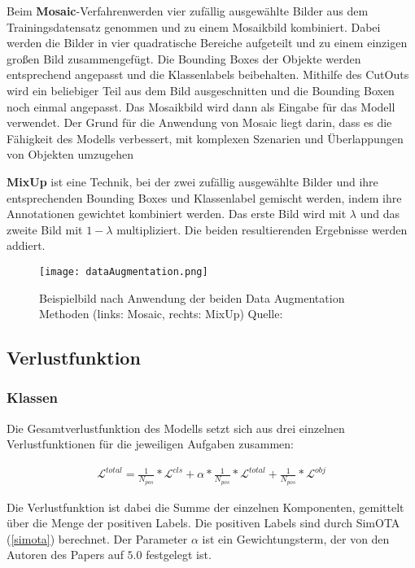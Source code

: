 Beim \textbf{Mosaic}-Verfahrenwerden vier zufällig ausgewählte Bilder aus dem Trainingsdatensatz genommen und zu einem Mosaikbild kombiniert. Dabei werden die Bilder in vier quadratische Bereiche aufgeteilt und zu einem einzigen großen Bild zusammengefügt. Die Bounding Boxes der Objekte werden entsprechend angepasst und die Klassenlabels beibehalten. Mithilfe des CutOuts wird ein beliebiger Teil aus dem Bild ausgeschnitten und die Bounding Boxen noch einmal angepasst. Das Mosaikbild wird dann als Eingabe für das Modell verwendet. Der Grund für die Anwendung von Mosaic liegt darin, dass es die Fähigkeit des Modells verbessert, mit komplexen Szenarien und Überlappungen von Objekten umzugehen

\textbf{MixUp} ist eine Technik, bei der zwei zufällig ausgewählte Bilder und ihre entsprechenden Bounding Boxes und Klassenlabel gemischt werden, indem ihre Annotationen gewichtet kombiniert werden. Das erste Bild wird mit $\lambda$ und das zweite Bild mit $1-\lambda$ multipliziert. Die beiden resultierenden Ergebnisse werden addiert. \cite{yoloxExplanationAug}

\begin{figure}[h]
	\centering
	\texttt{[image: dataAugmentation.png]}
	\caption[Beispielbild nach Anwendung der beiden Data Augmentation Methoden]{Beispielbild nach Anwendung der beiden Data Augmentation Methoden (links: Mosaic, rechts: MixUp) Quelle: \cite{yoloxExplanationAug}}
	\label{fig:yoloxExplanationAug}
\end{figure}



\subsection{Verlustfunktion}
\subsubsection{Klassen}
Die Gesamtverlustfunktion des Modells setzt sich aus drei einzelnen Verlustfunktionen für die jeweiligen Aufgaben zusammen:

\begin{align}
	\mathcal{L}^{total}=\frac{1}{N_{pos}}*\mathcal{L}^{cls}+\alpha*\frac{1}{N_{pos}}*	\mathcal{L}^{total}+	\frac{1}{N_{pos}}*\mathcal{L}^{obj}
\end{align}

Die Verlustfunktion ist dabei die Summe der einzelnen Komponenten, gemittelt über die Menge der positiven Labels. Die positiven Labels sind durch SimOTA (\ref{simota}) berechnet. Der Parameter $\alpha$ ist ein Gewichtungsterm, der von den Autoren des Papers auf $5.0$ festgelegt ist.

